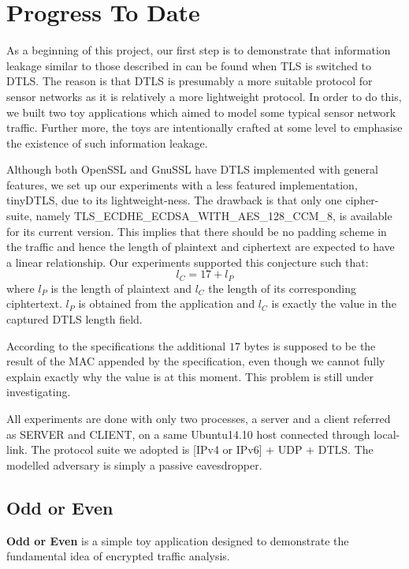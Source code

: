 \chapter{Progress To Date}
\label{Chp: Progress To Date}

As a beginning of this project, our first step is to demonstrate that information leakage similar to those described in \cite{Web1} can be found when TLS is switched to DTLS. The reason is that DTLS is presumably a more suitable protocol for sensor networks as it is relatively a more lightweight protocol. In order to do this, we built two toy applications which aimed to model some typical sensor network traffic. Further more, the toys are intentionally crafted at some level to emphasise the existence of such information leakage.

Although both OpenSSL and GnuSSL have DTLS implemented with general features, we set up our experiments with a less featured implementation, tinyDTLS\cite{tinyDTLS}, due to its lightweight-ness. The drawback is that only one cipher-suite, namely TLS\_ECDHE\_ECDSA\_WITH\_AES\_128\_CCM\_8\cite{rfc7251}, is available for its current version. This implies that there should be no padding scheme in the traffic and hence the length of plaintext and ciphertext are expected to have a linear relationship. Our experiments supported this conjecture such that:
\begin{equation} \label{Eq: Plaintext length}
l_C = 17 + l_P
\end{equation}
where $l_P$ is the length of plaintext and $l_C$ the length of its corresponding ciphtertext. $l_P$ is obtained from the application and $l_C$ is exactly the value in the captured DTLS length field.

According to the specifications the additional $17$ bytes is supposed to be the result of the MAC appended by the specification, even  though we cannot fully explain exactly why the value is at this moment. This problem is still under investigating.

All experiments are done with only two processes, a server and a client referred as SERVER and CLIENT, on a same Ubuntu14.10 host connected through local-link. The protocol suite we adopted is [IPv4 or IPv6] + UDP + DTLS. The modelled adversary is simply a passive eavesdropper.

\section{Odd or Even} \label{Sec: Odd or Even}
\textbf{Odd or Even} is a simple toy application designed  to demonstrate the fundamental idea of encrypted traffic analysis.

